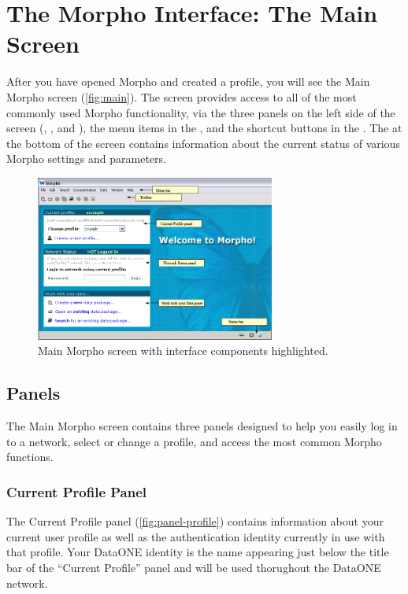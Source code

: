 \section{The Morpho Interface: The Main Screen} \label{sec:main}

After you have opened Morpho and created a profile, you will see the
Main Morpho screen (\autoref{fig:main}). The screen provides access to
all of the most commonly used Morpho functionality, via the three panels
on the left side of the screen (,
, and ), the
menu items in the , and the shortcut buttons in
the . The  at the bottom of
the screen contains information about the current status of various
Morpho settings and parameters.

\begin{figure}
  \centering
    \includegraphics[width=0.7\textwidth]{images/main.jpg}
  \caption{Main Morpho screen with interface components highlighted.}
  \label{fig:main}
\end{figure}

\subsection{Panels}

The Main Morpho screen contains three panels designed to help you easily
log in to a network, select or change a profile, and access the most
common Morpho functions.

\subsubsection[Current profile]{Current Profile Panel}
\label{sec:panel-profile}

The Current Profile panel (\autoref{fig:panel-profile}) contains
information about your current user profile as well as the authentication
identity currently in use with that profile. Your DataONE identity is the name
appearing just below the title bar of the ``Current
Profile'' panel and will be used thorughout the DataONE network. 

